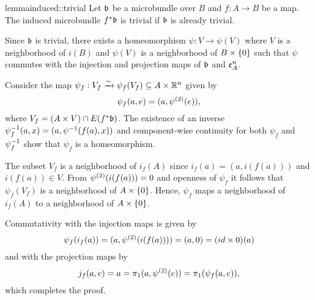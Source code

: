 \begin{mystatement}{lemma}{induced::trivial} Let $\bb$ be a microbundle over $B$ and $f: A \to B$ be a map. The induced microbundle $\ind{f}\bb$ is trivial if $\bb$ is already trivial. \end{mystatement}

\begin{myproof} Since $\bb$ is trivial, there exists a homeomorphism $\psi: V \to \psi(V)$ where $V$ is a neighborhood of $i(B)$ and $\psi(V)$ is a neighborhood of $B \times \{0\}$ such that $\psi$ commutes with the injection and projection maps of $\bb$ and $\mathfrak{e}^{n}_{A}$.

Consider the map $\psi_f: V_f \xrightarrow{\sim} \psi_f(V_f) \subseteq{} A \times \mathbb{R}^n$ given by \[ \psi_f(a, e) = (a, \psi^{(2)}(e)), \] where $V_f = (A \cross V) \cap E(\ind{f}\bb)$. The existence of an inverse $\psi_f^{-1}(a, x) = (a, \psi^{-1}(f(a), x))$ and component-wise continuity for both $\psi_f$ and $\psi_f^{-1}$ show that $\psi_f$ is a homeomorphism.

The subset $V_f$ is a neighborhood of $i_f(A)$ since $i_f(a) = (a, i(f(a)))$ and $i(f(a)) \in V$. From $\psi^{(2)}(i(f(a))) = 0$ and openness of $\psi_f$ it follows that $\psi_f(V_f)$ is a neighborhood of $A \times{} \{0\}$. Hence, $\psi_f$ maps a neighborhood of $i_f(A)$ to a neighborhood of $A \times{} \{0\}$.

Commutativity with the injection maps is given by \[ \psi_f(i_f(a)) = (a, \psi^{(2)}(i(f(a)))) = (a, 0) = (id \times 0)(a) \] and with the projection maps by \[ j_f(a, e) = a = \pi_1(a, \psi^{(2)}(e)) = \pi_1(\psi_f(a, e)), \] which completes the proof. \end{myproof}